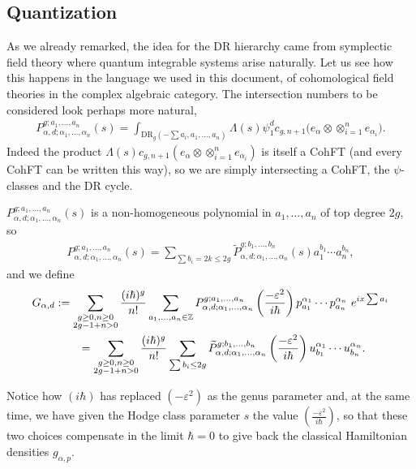 \documentclass[pdftex]{sigma}
\numberwithin{equation}{section}
\newcommand{\mbZ}{\mathbb Z}
\newcommand{\<}{\left<}
\renewcommand{\>}{\right>}
\newcommand{\eps}{\varepsilon}
\newcommand{\DR}{\mathrm{DR}}
\begin{document}
\subsection{Quantization} As we already remarked, the idea for the DR hierarchy came from symplectic f\/ield theory where quantum integrable systems arise naturally. Let us see how this happens in the language we used in this document, of cohomological f\/ield theories in the complex algebraic category. The intersection numbers to be considered look perhaps more natural,
\begin{gather*} P_{\alpha,d;\alpha_1,\dots,\alpha_n}^{g;a_1,\dots,a_n}(s)=\int_{\DR_g\left(-\sum a_i,a_1,\dots,a_n\right)}\Lambda\left(s\right) \psi_1^d c_{g,n+1}\big(e_\alpha\otimes\otimes_{i=1}^n e_{\alpha_i}\big).\end{gather*}
Indeed the product $\Lambda(s)c_{g,n+1}\left(e_\alpha\otimes\otimes_{i=1}^n e_{\alpha_i}\right)$ is itself a CohFT (and every CohFT can be written this way), so we are simply intersecting a CohFT, the $\psi$-classes and the DR cycle.

$P_{\alpha,d;\alpha_1,\dots,\alpha_n}^{g;a_1,\dots,a_n}(s)$ is a non-homogeneous polynomial in $a_1,\dots,a_n$ of top degree $2g$, so
\begin{gather*}P_{\alpha,d;\alpha_1,\dots,\alpha_n}^{g;a_1,\dots,a_n}(s) = \sum_{\sum b_i=2k \leq 2g} \widetilde{P}_{\alpha,d;\alpha_1,\dots,\alpha_n}^{g;b_1,\dots,b_n}(s) a_1^{b_1}\cdots a_n^{b_n}, \end{gather*}
and we def\/ine
\begin{gather*}
G_{\alpha,d}:=\sum_{\substack{g\ge 0,n\ge 0\\2g-1+n>0}}\frac{(i \hbar)^g}{n!}\sum_{a_1,\dots,a_n\in\mbZ}
P_{\alpha,d;\alpha_1,\dots,\alpha_n}^{g;a_1,\dots,a_n}\left(\frac{-\eps^2}{i\hbar}\right) p^{\alpha_1}_{a_1}\cdots p^{\alpha_n}_{a_n}\ e^{ix\sum a_i} \\
\hphantom{G_{\alpha,d}}{} = \sum_{\substack{g\ge 0,n\ge 0\\2g-1+n>0}}\frac{(i \hbar)^g}{n!}\sum_{\sum b_i \leq 2g}
\widetilde{P}_{\alpha,d;\alpha_1,\dots,\alpha_n}^{g;b_1,\dots,b_n}\left(\frac{-\eps^2}{i\hbar}\right) u^{\alpha_1}_{b_1}\cdots u^{\alpha_n}_{b_n}.
\end{gather*}

Notice how $(i\hbar)$ has replaced $(-\eps^2)$ as the genus parameter and, at the same time, we have given the Hodge class parameter $s$ the value $\left(\frac{-\eps^2}{i\hbar}\right)$, so that these two choices compensate in the limit $\hbar =0$ to give back the classical Hamiltonian densities $g_{\alpha,p}$.
\end{document}
